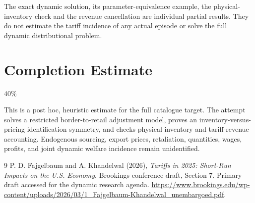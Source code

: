\documentclass[11pt,a4paper]{article}
\begin{document}
The exact dynamic solution, its parameter-equivalence example, the physical-inventory check and the revenue cancellation are individual partial results. They do not estimate the tariff incidence of any actual episode or solve the full dynamic distributional problem.

\section{Completion Estimate}
40\%

This is a post hoc, heuristic estimate for the full catalogue target.
The attempt solves a restricted border-to-retail adjustment model, proves an inventory-versus-pricing identification symmetry, and checks physical inventory and tariff-revenue accounting. Endogenous sourcing, export prices, retaliation, quantities, wages, profits, and joint dynamic welfare incidence remain unidentified.

\begin{thebibliography}{9}
 P. D. Fajgelbaum and A. Khandelwal (2026), \emph{Tariffs in 2025: Short-Run Impacts on the U.S. Economy}, Brookings conference draft, Section 7. Primary draft accessed for the dynamic research agenda. \url{https://www.brookings.edu/wp-content/uploads/2026/03/1_Fajgelbaum-Khandelwal_unembargoed.pdf}.
\end{thebibliography}
\end{document}
